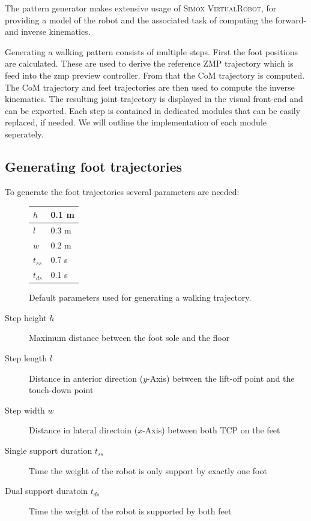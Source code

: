 \documentclass[english,ngerman]{KITreprt}
\newcommand{\name}[1]{\textsc{#1}}
\begin{document}
The pattern generator makes extensive usage of
\name{Simox VirtualRobot}, for providing a model of the robot and the
associated task of computing the forward- and inverse kinematics.

Generating a walking pattern consists of multiple steps. First the foot
positions are calculated. These are used to derive the reference ZMP
trajectory which is feed into the zmp preview controller. From that the
CoM trajectory is computed. The CoM trajectory and feet trajectories are
then used to compute the inverse kinematics. The resulting joint
trajectory is displayed in the visual front-end and can be exported.
Each step is contained in dedicated modules that can be easily replaced,
if needed. We will outline the implementation of each module seperately.

\subsection{Generating foot
trajectories}\label{generating-foot-trajectories}

To generate the foot trajectories several parameters are needed:

\begin{figure}[b]
\begin{center}
  \begin{tabular}{| l | l |}
    \hline
    $h$ & 0.1 m \\ \hline
    $l$ & 0.3 m \\ \hline
    $w$ & 0.2 m \\ \hline
    $t_{ss}$ & 0.7 s\\ \hline
    $t_{ds}$ & 0.1 s\\ \hline
  \end{tabular}
\caption{Default parameters used for generating a walking trajectory.}
\label{table:pattern-parameters}
\end{center}
\end{figure}

\begin{description}
\item[Step height $h$]
Maximum distance between the foot sole and the floor
\item[Step length $l$]
Distance in anterior direction ($y$-Axis) between the lift-off point and
the touch-down point
\item[Step width $w$]
Distance in lateral directoin ($x$-Axis) between both TCP on the feet
\item[Single support duration $t_{ss}$]
Time the weight of the robot is only support by exactly one foot
\item[Dual support duratoin $t_{ds}$]
Time the weight of the robot is supported by both feet
\end{description}
\end{document}

